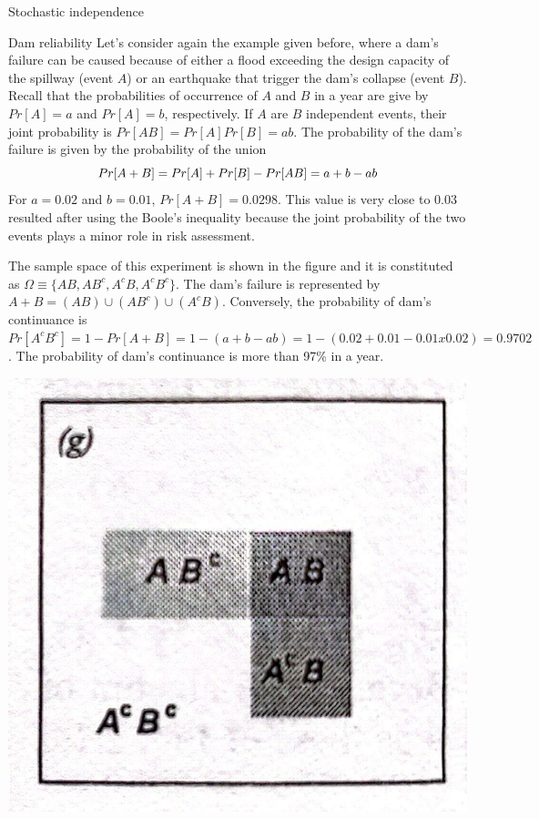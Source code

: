 \documentclass[8pt]{beamer}
\begin{document}
\begin{frame}{Stochastic independence}
    \begin{exampleblock}{Dam reliability}
        Let's consider again the example given before, where a dam's failure can be caused because of either a flood exceeding the design capacity of the spillway (event $A$) or an earthquake that trigger the dam's collapse (event $B$). Recall that the probabilities of occurrence of $A$ and $B$ in a year are give by $Pr[A] = a$ and $Pr[A] = b$, respectively. If $A$ are $B$ independent events, their joint probability is $Pr[AB] = Pr[A] Pr[B] = ab$. The probability of the dam's failure is given by the probability of the union 
        \vspace{-5pt}
        $$
        Pr[A + B] = Pr[A] + Pr[B] - Pr[AB] = a + b - ab 
        \vspace{-5pt}
        $$
        For $a = 0.02$  and $b = 0.01$, $Pr[A + B] = 0.0298$. This value is very close to 0.03 resulted after using the Boole's inequality because the joint probability of the two events plays a minor role in risk assessment. 
        \begin{minipage}{0.7\textwidth}
            The sample space of this experiment is shown in the figure and it is constituted as $\Omega \equiv \{ AB, A B^c , A^c B , A^c B^c \}$. The dam's failure is represented by $A + B = (AB) \cup (A B^c ) \cup (A^c B )$. Conversely, the probability of dam's continuance is $Pr[A^c B^c ] = 1 - Pr[A + B] = 1 - (a + b - ab) = 1 - (0.02 + 0.01 - 0.01 x 0.02) = 0.9702$. The probability of dam's continuance is more than 97\% in a year. 
        \end{minipage}
        \hfill
        \begin{minipage}{0.3\textwidth}
            \includegraphics[width=\linewidth]{fi216g.jpeg}

\end{minipage}
\end{exampleblock}
\end{frame}
\end{document}
